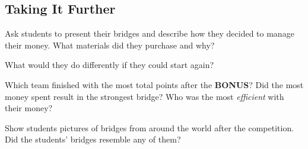 
\subsection{Taking It Further}
\begin{itemize*}
\item Ask students to present their bridges and describe how they decided to manage their money. What materials did they purchase and why?
\item What would they do differently if they could start again?
\item Which team finished with the most total points after the \textbf{BONUS}? Did the most money spent result in the strongest bridge? Who was the most \emph{efficient} with their money?
\item Show students pictures of bridges from around the world after the competition. Did the students’ bridges resemble any of them?
\end{itemize*}









